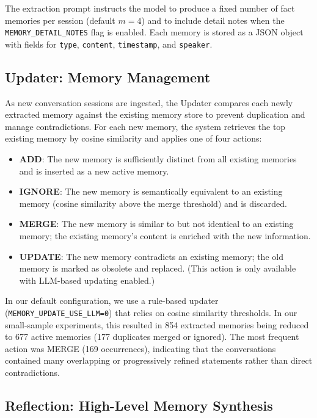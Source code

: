\documentclass[11pt]{article}
\begin{document}
The extraction prompt instructs the model to produce a fixed number of fact memories per session (default $m=4$) and to include detail notes when the \texttt{MEMORY\_DETAIL\_NOTES} flag is enabled. Each memory is stored as a JSON object with fields for \texttt{type}, \texttt{content}, \texttt{timestamp}, and \texttt{speaker}.

\subsection{Updater: Memory Management}

As new conversation sessions are ingested, the Updater compares each newly extracted memory against the existing memory store to prevent duplication and manage contradictions. For each new memory, the system retrieves the top existing memory by cosine similarity and applies one of four actions:

\begin{itemize}
    \item \textbf{ADD}: The new memory is sufficiently distinct from all existing memories and is inserted as a new active memory.
    \item \textbf{IGNORE}: The new memory is semantically equivalent to an existing memory (cosine similarity above the merge threshold) and is discarded.
    \item \textbf{MERGE}: The new memory is similar to but not identical to an existing memory; the existing memory's content is enriched with the new information.
    \item \textbf{UPDATE}: The new memory contradicts an existing memory; the old memory is marked as obsolete and replaced. (This action is only available with LLM-based updating enabled.)
\end{itemize}

In our default configuration, we use a rule-based updater (\texttt{MEMORY\_UPDATE\_USE\_LLM=0}) that relies on cosine similarity thresholds. In our small-sample experiments, this resulted in 854 extracted memories being reduced to 677 active memories (177 duplicates merged or ignored). The most frequent action was MERGE (169 occurrences), indicating that the conversations contained many overlapping or progressively refined statements rather than direct contradictions.

\subsection{Reflection: High-Level Memory Synthesis}
\end{document}
